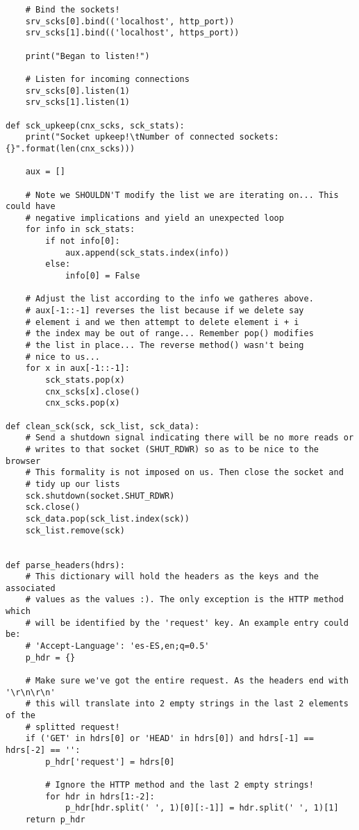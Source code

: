 \documentclass[landscape]{article}
\begin{document}
\begin{verbatim}
    # Bind the sockets!
    srv_scks[0].bind(('localhost', http_port))
    srv_scks[1].bind(('localhost', https_port))

    print("Began to listen!")

    # Listen for incoming connections
    srv_scks[0].listen(1)
    srv_scks[1].listen(1)

def sck_upkeep(cnx_scks, sck_stats):
    print("Socket upkeep!\tNumber of connected sockets: {}".format(len(cnx_scks)))

    aux = []

    # Note we SHOULDN'T modify the list we are iterating on... This could have
    # negative implications and yield an unexpected loop
    for info in sck_stats:
        if not info[0]:
            aux.append(sck_stats.index(info))
        else:
            info[0] = False

    # Adjust the list according to the info we gatheres above.
    # aux[-1::-1] reverses the list because if we delete say
    # element i and we then attempt to delete element i + i
    # the index may be out of range... Remember pop() modifies
    # the list in place... The reverse method() wasn't being
    # nice to us...
    for x in aux[-1::-1]:
        sck_stats.pop(x)
        cnx_scks[x].close()
        cnx_scks.pop(x)

def clean_sck(sck, sck_list, sck_data):
    # Send a shutdown signal indicating there will be no more reads or
    # writes to that socket (SHUT_RDWR) so as to be nice to the browser
    # This formality is not imposed on us. Then close the socket and
    # tidy up our lists
    sck.shutdown(socket.SHUT_RDWR)
    sck.close()
    sck_data.pop(sck_list.index(sck))
    sck_list.remove(sck)


def parse_headers(hdrs):
    # This dictionary will hold the headers as the keys and the associated
    # values as the values :). The only exception is the HTTP method which
    # will be identified by the 'request' key. An example entry could be:
    # 'Accept-Language': 'es-ES,en;q=0.5'
    p_hdr = {}

    # Make sure we've got the entire request. As the headers end with '\r\n\r\n'
    # this will translate into 2 empty strings in the last 2 elements of the
    # splitted request!
    if ('GET' in hdrs[0] or 'HEAD' in hdrs[0]) and hdrs[-1] == hdrs[-2] == '':
        p_hdr['request'] = hdrs[0]

        # Ignore the HTTP method and the last 2 empty strings!
        for hdr in hdrs[1:-2]:
            p_hdr[hdr.split(' ', 1)[0][:-1]] = hdr.split(' ', 1)[1]
    return p_hdr


\end{verbatim}
\end{document}
